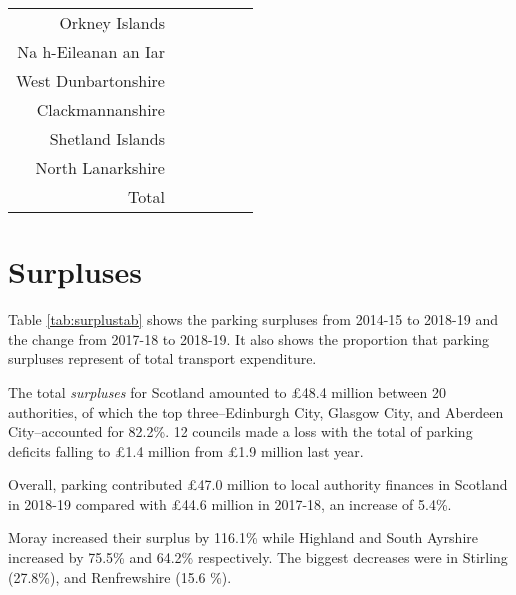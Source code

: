 \documentclass[
  12pt,
]{article}
\begin{document}
\begin{longtable}[t]{rrrrrr}
Orkney Islands & \cellcolor{white}{ 112.5\%} & \cellcolor{white}{ 115.3\%} & \cellcolor{white}{ 121.8\%} & \cellcolor{white}{  89.9\%} & \cellcolor{white}{  90.7\%}\\
Na h-Eileanan an Iar & \cellcolor{white}{ 226.3\%} & \cellcolor{white}{ 251.4\%} & \cellcolor{white}{ 283.3\%} & \cellcolor{white}{ 276.6\%} & \cellcolor{white}{ 155.4\%}\\
West Dunbartonshire & \cellcolor{white}{} & \cellcolor{white}{} & \cellcolor{white}{} & \cellcolor{white}{} & \cellcolor{white}{}\\
Clackmannanshire & \cellcolor{white}{ 746.7\%} & \cellcolor{white}{ 657.1\%} & \cellcolor{white}{} & \cellcolor{white}{} & \cellcolor{white}{ 130.3\%}\\
Shetland Islands & \cellcolor{white}{  96.6\%} & \cellcolor{white}{  98.6\%} & \cellcolor{white}{ 133.3\%} & \cellcolor{white}{  85.7\%} & \cellcolor{white}{ 253.8\%}\\
North Lanarkshire & \cellcolor{white}{} & \cellcolor{white}{} & \cellcolor{white}{} & \cellcolor{white}{} & \cellcolor{white}{}\\
\midrule
Total & \cellcolor{white}{  52.1\%} & \cellcolor{white}{  50.9\%} & \cellcolor{white}{  48.4\%} & \cellcolor{white}{  49.5\%} & \cellcolor{white}{  47.0\%}\\*
\end{longtable}
\endgroup{}

\newpage

\hypertarget{surpluses}{%
\section{Surpluses}\label{surpluses}}

Table \ref{tab:surplustab} shows the parking surpluses from 2014-15 to 2018-19 and the change from 2017-18 to 2018-19. It also shows the proportion that parking surpluses represent of total transport expenditure.

The total \emph{surpluses} for Scotland amounted to £48.4 million between 20 authorities, of which the top three--Edinburgh City, Glasgow City, and Aberdeen City--accounted for 82.2\%. 12 councils made a loss with the total of parking deficits falling to £1.4 million from £1.9 million last year.

Overall, parking contributed £47.0 million to local authority finances in Scotland in 2018-19 compared with £44.6 million in 2017-18, an increase of 5.4\%.

Moray increased their surplus by 116.1\%
while Highland and South Ayrshire increased by 75.5\% and 64.2\% respectively. The biggest decreases were in Stirling (27.8\%), and Renfrewshire (15.6 \%).
\end{document}
